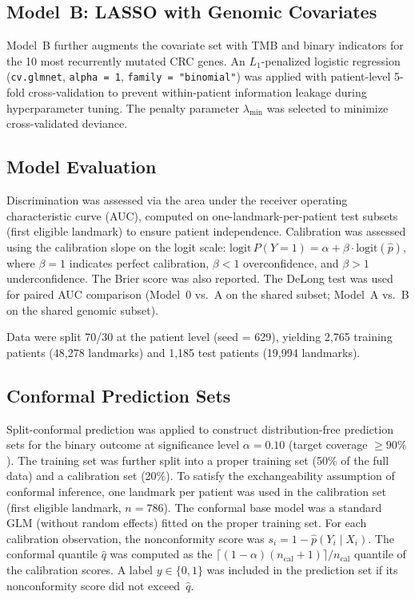 \documentclass[11pt]{article}
\begin{document}
\subsection*{Model~B: LASSO with Genomic Covariates}

Model~B further augments the covariate set with TMB and binary indicators for the 10 most recurrently mutated CRC genes. An $L_1$-penalized logistic regression (\texttt{cv.glmnet}, \texttt{alpha = 1}, \texttt{family = "binomial"}) was applied with patient-level 5-fold cross-validation to prevent within-patient information leakage during hyperparameter tuning. The penalty parameter $\lambda_\text{min}$ was selected to minimize cross-validated deviance.

\subsection*{Model Evaluation}

Discrimination was assessed via the area under the receiver operating characteristic curve (AUC), computed on one-landmark-per-patient test subsets (first eligible landmark) to ensure patient independence. Calibration was assessed using the calibration slope on the logit scale: $\text{logit}\,P(Y=1) = \alpha + \beta \cdot \text{logit}(\hat{p})$, where $\beta = 1$ indicates perfect calibration, $\beta < 1$ overconfidence, and $\beta > 1$ underconfidence. The Brier score was also reported. The DeLong test was used for paired AUC comparison (Model~0 vs.~A on the shared subset; Model~A vs.~B on the shared genomic subset).

Data were split 70/30 at the patient level (seed = 629), yielding 2,765 training patients (48,278 landmarks) and 1,185 test patients (19,994 landmarks).

\subsection*{Conformal Prediction Sets}

Split-conformal prediction was applied to construct distribution-free prediction sets for the binary outcome at significance level $\alpha = 0.10$ (target coverage $\geq 90\%$). The training set was further split into a proper training set (50\% of the full data) and a calibration set (20\%). To satisfy the exchangeability assumption of conformal inference, one landmark per patient was used in the calibration set (first eligible landmark, $n = 786$). The conformal base model was a standard GLM (without random effects) fitted on the proper training set. For each calibration observation, the nonconformity score was $s_i = 1 - \hat{p}(Y_i \mid X_i)$. The conformal quantile $\hat{q}$ was computed as the $\lceil(1 - \alpha)(n_\text{cal} + 1)\rceil / n_\text{cal}$ quantile of the calibration scores. A label $y \in \{0, 1\}$ was included in the prediction set if its nonconformity score did not exceed~$\hat{q}$.
\end{document}
